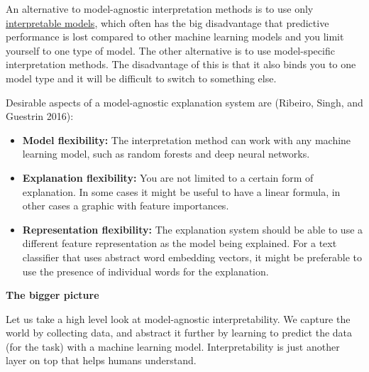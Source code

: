 \documentclass[
  12pt,
]{krantz}
\providecommand{\tightlist}{%
  \setlength{\itemsep}{0pt}\setlength{\parskip}{0pt}}
\begin{document}
An alternative to model-agnostic interpretation methods is to use only \protect\hyperlink{simple}{interpretable models}, which often has the big disadvantage that predictive performance is lost compared to other machine learning models and you limit yourself to one type of model.
The other alternative is to use model-specific interpretation methods.
The disadvantage of this is that it also binds you to one model type and it will be difficult to switch to something else.

Desirable aspects of a model-agnostic explanation system are (Ribeiro, Singh, and Guestrin 2016):

\begin{itemize}
\tightlist
\item
  \textbf{Model flexibility:}
  The interpretation method can work with any machine learning model, such as random forests and deep neural networks.
\item
  \textbf{Explanation flexibility:}
  You are not limited to a certain form of explanation.
  In some cases it might be useful to have a linear formula, in other cases a graphic with feature importances.
\item
  \textbf{Representation flexibility:}
  The explanation system should be able to use a different feature representation as the model being explained.
  For a text classifier that uses abstract word embedding vectors, it might be preferable to use the presence of individual words for the explanation.
\end{itemize}

\textbf{The bigger picture}

Let us take a high level look at model-agnostic interpretability.
We capture the world by collecting data, and abstract it further by learning to predict the data (for the task) with a machine learning model.
Interpretability is just another layer on top that helps humans understand.
\end{document}
